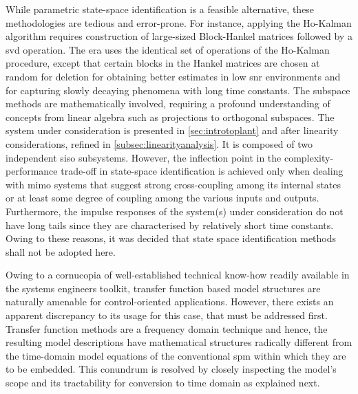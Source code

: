 While  parametric state-space  identification is  a feasible  alternative, these
methodologies are tedious and error-prone.  For instance, applying the Ho-Kalman
algorithm requires construction of large-sized Block-Hankel matrices followed by
a  \gls{svd} operation.  The  \gls{era}  uses the  identical  set of  operations
of  the  Ho-Kalman   procedure,  except  that  certain  blocks   in  the  Hankel
matrices  are chosen  at  random  for deletion  for  obtaining better  estimates
in  low  \gls{snr} environments  and  for  capturing slowly  decaying  phenomena
with  long time  constants. The  subspace methods  are mathematically  involved,
requiring  a  profound  understanding  of  concepts  from  linear  algebra  such
as  projections  to orthogonal  subspaces.  The  system under  consideration  is
presented in \cref{sec:introtoplant} and after linearity considerations, refined
in \cref{subsec:linearityanalysis}. It is composed of two independent \gls{siso}
subsystems.  However,   the  inflection  point  in   the  complexity-performance
trade-off  in state-space  identification  is achieved  only  when dealing  with
\gls{mimo} systems that suggest strong  cross-coupling among its internal states
or  at least  some degree  of  coupling among  the various  inputs and  outputs.
Furthermore, the impulse  responses of the system(s) under  consideration do not
have long tails since they are characterised by relatively short time constants.
Owing to these  reasons, it was decided that state  space identification methods
shall not be adopted here.

Owing to a  cornucopia of well-established technical  know-how readily available
in the systems  engineers toolkit, transfer function based  model structures are
naturally amenable  for control-oriented applications. However,  there exists an
apparent discrepancy to  its usage for this case, that  must be addressed first.
Transfer  function methods  are  a  frequency domain  technique  and hence,  the
resulting model  descriptions have  mathematical structures  radically different
from the time-domain model equations  of the conventional \gls{spm} within which
they are  to be embedded. This  conundrum is resolved by  closely inspecting the
model's scope  and its tractability for  conversion to time domain  as explained
next.

